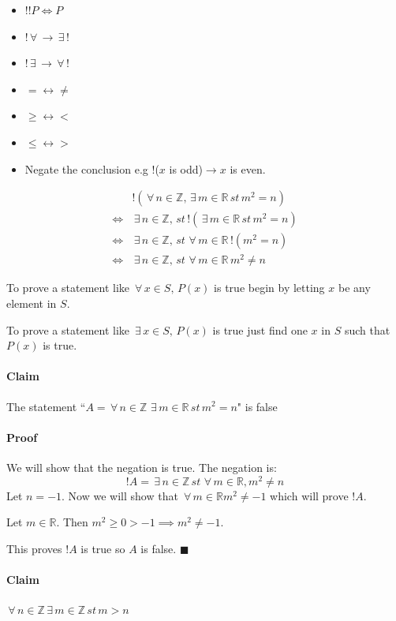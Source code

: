 \documentclass{article}
\newcommand{\bb}[1]{\mathbb{#1}}
\newcommand{\A}{\,\forall\,}
\newcommand{\E}{\,\exists\,}
\begin{document}
\begin{itemize}
\item \(!!P\iff P\)
\item \(!\A\longrightarrow\E!\)
\item \(!\E\longrightarrow\A!\)
\item \(=\longleftrightarrow\ne\)
\item \(\ge\longleftrightarrow<\)
\item \(\le\longleftrightarrow>\)
\item Negate the conclusion e.g \(!\)(\(x\) is odd)\(\longrightarrow x\) is even.
\end{itemize}

\begin{align*}
&!(\A n\in \bb Z,\E m\in\bb R\,st\,m^2=n)\\
\iff&\E n\in \bb Z,\,st\,!(\E m\in \bb R\,st\,m^2=n)\\
\iff&\E n\in \bb Z,\,st\,\A m\in \bb R\, !(m^2=n)\\
\iff&\E n\in \bb Z,\,st\,\A m\in \bb R\, m^2\ne n
\end{align*}

To prove a statement like \(\A x\in S,\,P(x)\) is true begin by letting \(x\) be any element in \(S\).

To prove a statement like \(\E x\in S,\,P(x)\) is true just find one \(x\) in \(S\) such that \(P(x)\) is true.

\paragraph{Claim} The statement ``\(A=\A n\in\bb Z\,\E m\in\bb R\,st\,m^2=n\)" is false

\paragraph{Proof} We will show that the negation is true. The negation is:
\[!A=\E n\in\bb Z\,st\,\A m\in\bb R, m^2\ne n\]
Let \(n=-1\). Now we will show that \(\A m\in\bb R m^2\ne-1\) which will prove \(!A\).

Let \(m\in\bb R\). Then \(m^2\ge 0>-1\implies m^2\ne-1\).

This proves \(!A\) is true so \(A\) is false. \(\blacksquare\)

\paragraph{Claim} \(\A n\in \bb Z\E m\in\bb Z\,st\,m>n\)
\end{document}

